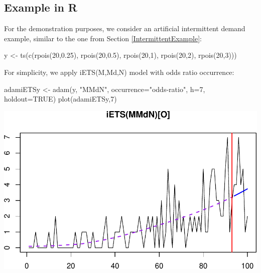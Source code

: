 \documentclass[
]{book}
\newenvironment{Shaded}{\begin{snugshade}}{\end{snugshade}}
\newcommand{\AttributeTok}[1]{\textcolor[rgb]{0.77,0.63,0.00}{#1}}
\newcommand{\ConstantTok}[1]{\textcolor[rgb]{0.00,0.00,0.00}{#1}}
\newcommand{\DecValTok}[1]{\textcolor[rgb]{0.00,0.00,0.81}{#1}}
\newcommand{\FloatTok}[1]{\textcolor[rgb]{0.00,0.00,0.81}{#1}}
\newcommand{\FunctionTok}[1]{\textcolor[rgb]{0.00,0.00,0.00}{#1}}
\newcommand{\NormalTok}[1]{#1}
\newcommand{\OtherTok}[1]{\textcolor[rgb]{0.56,0.35,0.01}{#1}}
\newcommand{\StringTok}[1]{\textcolor[rgb]{0.31,0.60,0.02}{#1}}
\theoremstyle{definition}
\theoremstyle{definition}
\theoremstyle{definition}
\theoremstyle{definition}
\theoremstyle{remark}
\begin{document}
\hypertarget{forecastingADAMOtherExample}{%
\subsection{Example in R}\label{forecastingADAMOtherExample}}

For the demonstration purposes, we consider an artificial intermittent demand example, similar to the one from Section \ref{IntermittentExample}:

\begin{Shaded}
\begin{Highlighting}[]
\NormalTok{y }\OtherTok{\textless{}{-}} \FunctionTok{ts}\NormalTok{(}\FunctionTok{c}\NormalTok{(}\FunctionTok{rpois}\NormalTok{(}\DecValTok{20}\NormalTok{,}\FloatTok{0.25}\NormalTok{), }\FunctionTok{rpois}\NormalTok{(}\DecValTok{20}\NormalTok{,}\FloatTok{0.5}\NormalTok{), }\FunctionTok{rpois}\NormalTok{(}\DecValTok{20}\NormalTok{,}\DecValTok{1}\NormalTok{),}
          \FunctionTok{rpois}\NormalTok{(}\DecValTok{20}\NormalTok{,}\DecValTok{2}\NormalTok{), }\FunctionTok{rpois}\NormalTok{(}\DecValTok{20}\NormalTok{,}\DecValTok{3}\NormalTok{)))}
\end{Highlighting}
\end{Shaded}

For simplicity, we apply iETS(M,Md,N) model with odds ratio occurrence:

\begin{Shaded}
\begin{Highlighting}[]
\NormalTok{adamiETSy }\OtherTok{\textless{}{-}} \FunctionTok{adam}\NormalTok{(y, }\StringTok{"MMdN"}\NormalTok{, }\AttributeTok{occurrence=}\StringTok{"odds{-}ratio"}\NormalTok{,}
                  \AttributeTok{h=}\DecValTok{7}\NormalTok{, }\AttributeTok{holdout=}\ConstantTok{TRUE}\NormalTok{)}
\FunctionTok{plot}\NormalTok{(adamiETSy,}\DecValTok{7}\NormalTok{)}
\end{Highlighting}
\end{Shaded}

\includegraphics{Svetunkov--2022----ADAM_files/figure-latex/unnamed-chunk-153-1.pdf}
\end{document}
